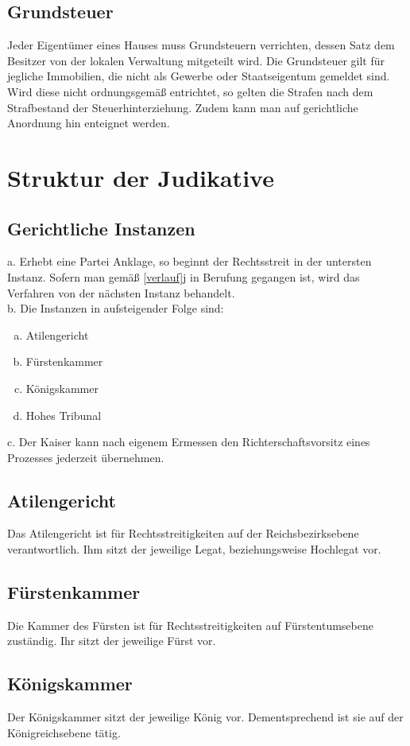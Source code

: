 \documentclass{article}
\begin{document}
\subsection{Grundsteuer}
Jeder Eigentümer eines Hauses muss Grundsteuern verrichten, dessen Satz dem Besitzer von der lokalen Verwaltung mitgeteilt wird. Die Grundsteuer gilt für jegliche Immobilien, die nicht als Gewerbe oder Staatseigentum gemeldet sind. Wird diese nicht ordnungsgemäß entrichtet, so gelten die Strafen nach dem Strafbestand der Steuerhinterziehung. Zudem kann man auf gerichtliche Anordnung hin enteignet werden.

\section{Struktur der Judikative}

\subsection{Gerichtliche Instanzen}
a. Erhebt eine Partei Anklage, so beginnt der Rechtsstreit in der untersten Instanz. Sofern man gemäß \ref{verlauf}j in Berufung gegangen ist, wird das Verfahren von der nächsten Instanz behandelt.\\
b. Die Instanzen in aufsteigender Folge sind:
\begin{enumerate}[a)]
	\item Atilengericht
	\item Fürstenkammer
	\item Königskammer
	\item Hohes Tribunal
\end{enumerate}
c. Der Kaiser kann nach eigenem Ermessen den Richterschaftsvorsitz eines Prozesses jederzeit übernehmen.

\subsection{Atilengericht}
Das Atilengericht ist für Rechtsstreitigkeiten auf der Reichsbezirksebene verantwortlich. Ihm sitzt der jeweilige Legat, beziehungsweise Hochlegat vor.

\subsection{Fürstenkammer}
Die Kammer des Fürsten ist für Rechtsstreitigkeiten auf Fürstentumsebene zuständig. Ihr sitzt der jeweilige Fürst vor.

\subsection{Königskammer}
Der Königskammer sitzt der jeweilige König vor. Dementsprechend ist sie auf der Königreichsebene tätig.
\end{document}
